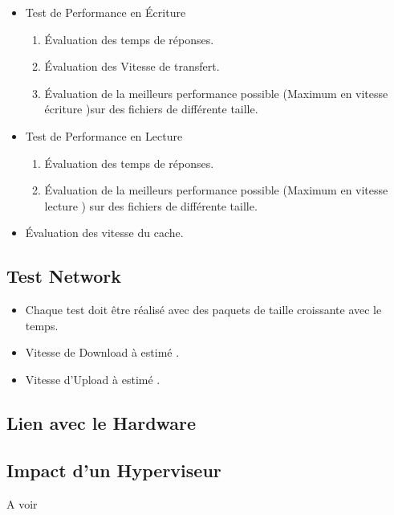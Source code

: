 \documentclass[french]{article}
\begin{document}
\begin{itemize}
\item Test de Performance en Écriture 
		\begin{enumerate}
		\item Évaluation des temps de réponses. 
		\item Évaluation des Vitesse de transfert.
		\item Évaluation de la meilleurs performance possible (Maximum en vitesse écriture )sur des fichiers de différente taille.
		\end{enumerate}
\item Test de Performance en Lecture 
		\begin{enumerate}
		\item Évaluation des temps de réponses. 
		\item Évaluation de la meilleurs performance possible (Maximum en vitesse lecture ) sur des fichiers de différente taille. 
		\end{enumerate}
\item Évaluation des vitesse du cache.
\end{itemize}

\subsection{Test Network}
\begin{itemize}
\item Chaque test doit être réalisé avec des paquets de taille croissante avec le temps.
\item Vitesse de Download à estimé .
\item Vitesse d'Upload à estimé .
\end{itemize}
\subsection{Lien avec le Hardware}

\subsection{Impact d'un Hyperviseur}
A voir 
\end{document}
